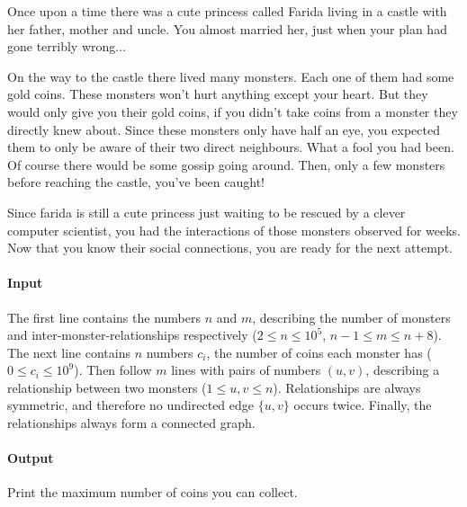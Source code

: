 



\makeheader

Once upon a time there was a cute princess called Farida living in a castle with her father, mother and uncle.
You almost married her, just when your plan had gone terribly wrong...

On the way to the castle there lived many monsters.
Each one of them had some gold coins.
These monsters won't hurt anything except your heart.
But they would only give you their gold coins, if you didn't take coins from a monster they directly knew about.
Since these monsters only have half an eye, you expected them to only be aware of their two direct neighbours.
What a fool you had been.
Of course there would be some gossip going around.
Then, only a few monsters before reaching the castle, you've been caught!

Since farida is still a cute princess just waiting to be rescued by a clever computer scientist, you had the interactions of those monsters observed for weeks.
Now that you know their social connections, you are ready for the next attempt.

\paragraph*{Input}

The first line contains the numbers $n$ and $m$, describing the number of monsters and inter-monster-relationships respectively ($2 \leq n \leq 10^5$, $n - 1 \leq m \leq n + 8$).
The next line contains $n$ numbers $c_i$, the number of coins each monster has ($0 \leq c_i \leq 10^9$).
Then follow $m$ lines with pairs of numbers $(u, v)$, describing a relationship between two monsters ($1 \leq u, v \leq n$).
Relationships are always symmetric, and therefore no undirected edge $\{u, v\}$ occurs twice.
Finally, the relationships always form a connected graph.

\paragraph*{Output}

Print the maximum number of coins you can collect.

\begin{samples}
\end{samples}

